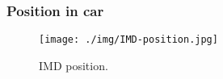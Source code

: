 \subsubsection{Position in car}

\begin{figure}[H]
	\centering
	\texttt{[image: ./img/IMD-position.jpg]}
	\caption{IMD position.}
	\label{fig:IMD-position}
\end{figure}
